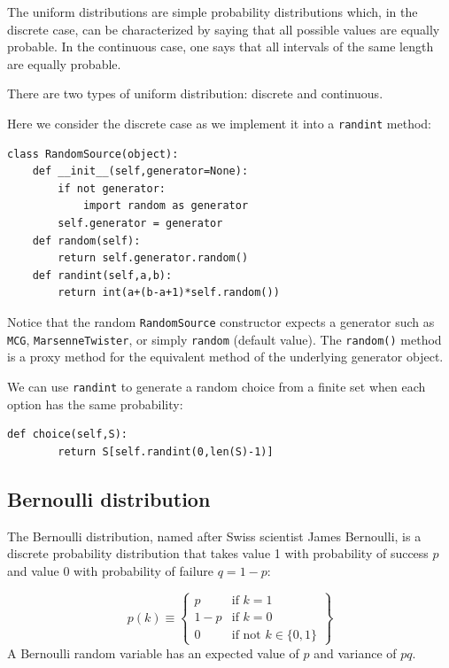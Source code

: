 \documentclass[justified,sixbynine]{tufte-book}
\def\ft{\small\tt}
\theoremstyle{plain}%
\theoremstyle{definition}
\theoremstyle{remark}
\begin{document}
\begin{fullwidth}
The uniform distributions are simple probability distributions which, in the
discrete case, can be characterized by saying that all possible values are
equally probable. In the continuous case, one says that all intervals of the
same length are equally probable.

There are two types of uniform distribution: discrete and continuous.

Here we consider the discrete case as we implement it into a {\ft randint} method:


\begin{lstlisting}[caption={in file: {\ft nlib.py}}]
class RandomSource(object):
    def __init__(self,generator=None):
        if not generator:
            import random as generator
        self.generator = generator
    def random(self):
        return self.generator.random()
    def randint(self,a,b):
        return int(a+(b-a+1)*self.random())
\end{lstlisting}

Notice that the random {\ft RandomSource} constructor expects a generator such as {\ft MCG}, {\ft MarsenneTwister}, or simply {\ft random} (default value). The {\ft random()} method is a proxy method for the equivalent method of the underlying generator object.

We can use {\ft randint} to generate a random choice from a finite set when each option has the same probability:

\begin{lstlisting}[caption={in file: {\ft nlib.py}}]
    def choice(self,S):
        return S[self.randint(0,len(S)-1)]
\end{lstlisting}

\goodbreak\subsection{Bernoulli distribution}

The Bernoulli distribution, named after Swiss scientist James Bernoulli, is
a discrete probability distribution that takes value 1 with
probability of success $p$ and value 0 with probability of failure $q=1-p$:

\begin{equation}
p(k) \equiv \left\{
\begin{array}{ll}
p & \text{if }k=1 \\
1-p & \text{if }k=0 \\
0 & \text{if not }k \in \{0,1\}
\end{array}
\right\}
\end{equation}
A Bernoulli random variable has an expected value of $p$ and variance of $pq$.


\end{fullwidth}
\end{document}
